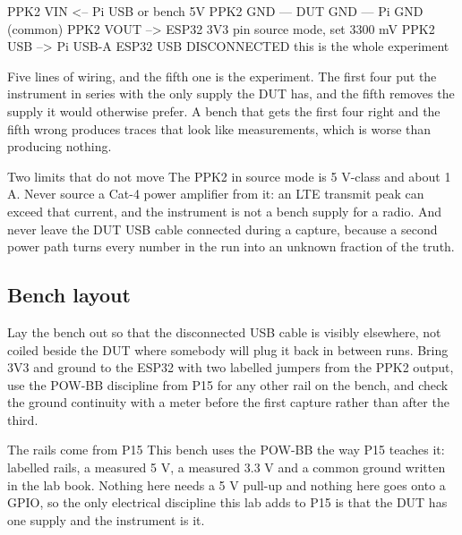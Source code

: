 \begin{asciiart}
PPK2 VIN   <--  Pi USB or bench 5V
PPK2 GND   ---  DUT GND --- Pi GND (common)
PPK2 VOUT  -->  ESP32 3V3 pin     source mode, set 3300 mV
PPK2 USB   -->  Pi USB-A
ESP32 USB  DISCONNECTED           this is the whole experiment
\end{asciiart}

Five lines of wiring, and the fifth one is the experiment. The first four put the
instrument in series with the only supply the DUT has, and the fifth removes the supply it
would otherwise prefer. A bench that gets the first four right and the fifth wrong produces
traces that look like measurements, which is worse than producing nothing.

\begin{rulebox}{Two limits that do not move}
The PPK2 in source mode is 5 V-class and about 1 A. Never source a Cat-4 power amplifier
from it: an LTE transmit peak can exceed that current, and the instrument is not a bench
supply for a radio. And never leave the DUT USB cable connected during a capture, because
a second power path turns every number in the run into an unknown fraction of the truth.
\end{rulebox}

\subsection*{Bench layout}


Lay the bench out so that the disconnected USB cable is visibly elsewhere, not coiled
beside the DUT where somebody will plug it back in between runs. Bring 3V3 and ground to
the ESP32 with two labelled jumpers from the PPK2 output, use the POW-BB discipline from
P15 for any other rail on the bench, and check the ground continuity with a meter before
the first capture rather than after the third.

\begin{note}{The rails come from P15}
This bench uses the POW-BB the way P15 teaches it: labelled rails, a measured 5 V, a
measured 3.3 V and a common ground written in the lab book. Nothing here needs a 5 V pull-up
and nothing here goes onto a GPIO, so the only electrical discipline this lab adds to P15 is
that the DUT has one supply and the instrument is it.
\end{note}

